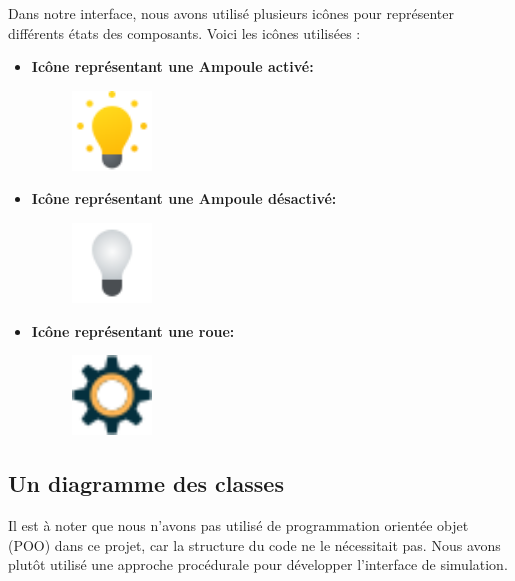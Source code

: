 \documentclass{article}
\begin{document}
Dans notre interface, nous avons utilisé plusieurs icônes pour représenter différents états des composants. Voici les icônes utilisées :
\begin{itemize}
    \item \textbf{Icône représentant une Ampoule activé:}
    \begin{figure}[H]
        \centering
        \includegraphics[width=0.2\textwidth]{../Assetes/Aon.png}
    \end{figure}
    
    \item \textbf{Icône représentant une Ampoule désactivé:}
    \begin{figure}[H]
        \centering
        \includegraphics[width=0.2\textwidth]{../Assetes/Aoff.png}
    \end{figure}
    
    \item \textbf{Icône représentant une roue:}
    \begin{figure}[H]
        \centering
        \includegraphics[width=0.2\textwidth]{../Assetes/roue.png}
    \end{figure}
\end{itemize}

\subsection{Un diagramme des classes}

Il est à noter que nous n'avons pas utilisé de programmation orientée objet (POO) dans ce projet, car la structure du code ne le nécessitait pas. Nous avons plutôt utilisé une approche procédurale pour développer l'interface de simulation.
\end{document}
